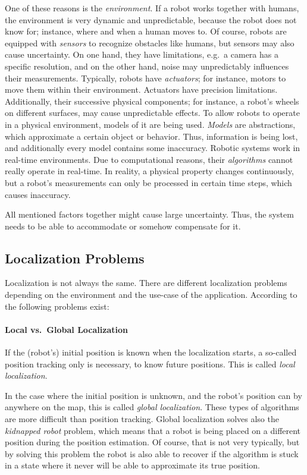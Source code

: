 One of these reasons is the \emph{environment}. If a robot works together with humans, the environment is very dynamic and unpredictable, because the robot does not know for; instance, where and when a human moves to.
Of course, robots are equipped with \emph{sensors} to recognize obstacles like humans, but sensors may also cause uncertainty. On one hand, they have limitations, e.g.\ a camera has a specific resolution, and on the other hand, noise may unpredictably influences their measurements. 
Typically, robots have \emph{actuators}; for instance, motors to move them within their environment. Actuators have precision limitations. Additionally, their successive physical components; for instance, a robot's wheels on different surfaces, may cause unpredictable effects.
To allow robots to operate in a physical environment, models of it are being used. \emph{Models} are abstractions, which approximate a certain object or behavior. Thus, information is being lost, and additionally every model contains some inaccuracy. Robotic systems work in real-time environments. Due to computational reasons, their \emph{algorithms} cannot really operate in real-time. In reality, a physical property changes continuously, but a robot's measurements can only be processed in certain time steps, which causes inaccuracy. 

All mentioned factors together might cause large uncertainty. Thus, the system needs to be able to accommodate or somehow compensate for it.

\subsection{Localization Problems}
Localization is not always the same. There are different localization problems depending on the environment and the use-case of the application. According to \citet{thrun:prob_robo} the following problems exist:

\paragraph{Local vs.\ Global Localization} If the (robot's) initial position is known when the localization starts, a so-called position tracking only is necessary, to know future positions. This is called \emph{local localization}.

In the case where the initial position is unknown, and the robot's position can by anywhere on the map, this is called \emph{global localization}. These types of algorithms are more difficult than position tracking. Global localization solves also the \emph{kidnapped robot} problem, which means that a robot is being placed on a different position during the position estimation. Of course, that is not very typically, but by solving this problem the robot is also able to recover if the algorithm is stuck in a state where it never will be able to approximate its true position.

